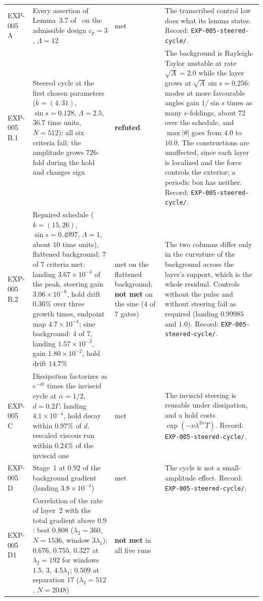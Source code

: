\documentclass[11pt]{article}
\theoremstyle{remark}
\newcommand{\fp}[1]{\nolinkurl{#1}}
\begin{document}
\begin{longtable}{@{}L{1.45cm}L{5.9cm}L{1.85cm}L{5.0cm}@{}}
EXP-005 A & Every assertion of Lemma~3.7 of~\cite{ab-boussinesq} on the admissible design $c_{p}=3$, $\Lambda=12$ & met & The transcribed control law does what its lemma states. Record: \fp{EXP-005-steered-cycle/}. \\
EXP-005 B.1 & Steered cycle at the first chosen parameters ($k=(4,31)$, $\sin s=0.128$, $\Lambda=2.5$, $36.7$ time units, $N=512$): all six criteria fail; the amplitude grows $726$-fold during the hold and changes sign & \textbf{refuted} &
The background is Rayleigh-Taylor unstable at rate $\sqrt A=2.0$ while the layer grows at $\sqrt A\sin s=0.256$: modes at more favourable angles gain $1/\sin s$ times as many $e$-foldings, about $72$ over the schedule, and $\max|\theta|$ goes from $4.0$ to $10.0$. The constructions are unaffected, since each layer is localized and the force controls the exterior; a periodic box has neither. Record: \fp{EXP-005-steered-cycle/}. \\
EXP-005 B.2 & Repaired schedule ($k=(15,26)$, $\sin s=0.4997$, $\Lambda=1$, about $10$ time units), flattened background: $7$ of $7$ criteria met: landing $3.67\times10^{-4}$ of the peak, steering gain $3.06\times10^{-6}$, hold drift $0.36\%$ over three growth times, endpoint map $4.7\times10^{-4}$; sine background: $4$ of $7$, landing $1.57\times10^{-2}$, gain $1.80\times10^{-2}$, hold drift $14.7\%$ & met on the flattened background; \textbf{not met} on the sine ($4$ of $7$ gates) & The two columns differ only in the curvature of the background across the layer's support, which is the whole residual. Controls without the pulse and without steering fail as required (landing $0.99985$ and $1.0$). Record: \fp{EXP-005-steered-cycle/}. \\
EXP-005 C & Dissipation factorizes as $e^{-dt}$ times the inviscid cycle at $\alpha=1/2$, $d=0.2\Gamma$: landing $4.1\times10^{-4}$, hold decay within $0.97\%$ of $d$, rescaled viscous run within $0.24\%$ of the inviscid one & met & The inviscid steering is reusable under dissipation, and a hold costs $\exp(-\nu\lambda^{2\alpha}T)$. Record: \fp{EXP-005-steered-cycle/}. \\
EXP-005 D & Stage~1 at $0.92$ of the background gradient (landing $3.8\times10^{-4}$) & met & The cycle is not a small-amplitude effect. Record: \fp{EXP-005-steered-cycle/}. \\
EXP-005 D1 & Correlation of the rate of layer~2 with the total gradient above $0.9$: best $0.808$ ($\lambda_{2}=360$, $N=1536$, window $3\lambda_{1}$); $0.676$, $0.755$, $0.327$ at $\lambda_{2}=192$ for windows $1.5$, $3$, $4.5\lambda_{1}$; $0.509$ at separation $17$ ($\lambda_{2}=512$, $N=2048$) & \textbf{not met} in all five runs &

\end{longtable}
\end{document}
